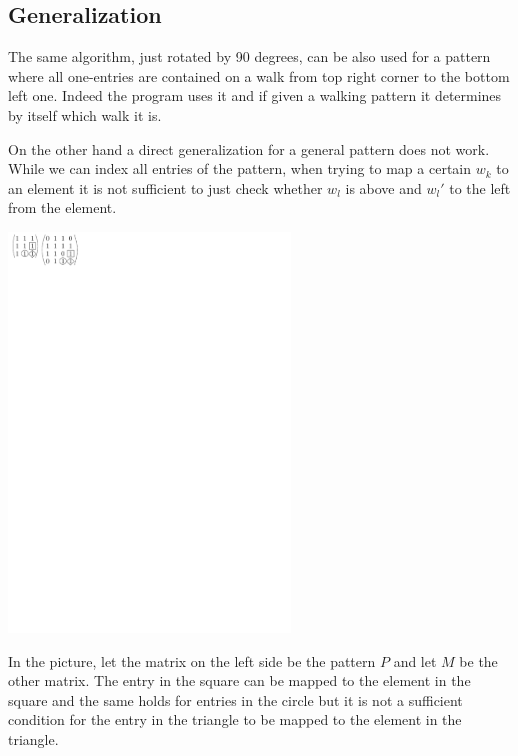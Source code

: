 \subsection{Generalization}
The same algorithm, just rotated by 90 degrees, can be also used for a pattern where all one-entries are contained on a walk from top right corner to the bottom left one. Indeed the program uses it and if given a walking pattern it determines by itself which walk it is.

On the other hand a direct generalization for a general pattern does not work. While we can index all entries of the pattern, when trying to map a certain $w_k$ to an element it is not sufficient to just check whether $w_l$ is above and $w_l'$ to the left from the element.

\centerline{\mbox{\includegraphics[width=75mm]{../img/nogeneral.pdf}}}

In the picture, let the matrix on the left side be the pattern $P$ and let $M$ be the other matrix. The entry in the square can be mapped to the element in the square and the same holds for entries in the circle but it is not a sufficient condition for the entry in the triangle to be mapped to the element in the triangle.